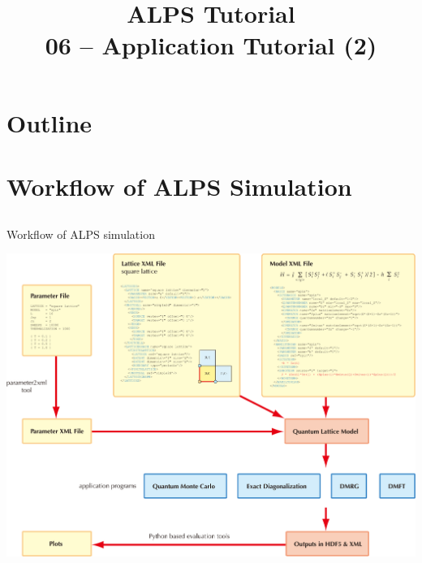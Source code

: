 
\title{ALPS Tutorial \\ 06 -- Application Tutorial (2)}




\begin{frame}
  \titlepage
\end{frame}

\section*{Outline}
\begin{frame}[t,fragile]
   \tableofcontents
\end{frame}

\section{Workflow of ALPS Simulation}
\subsection*{\redm\whiteb\greenb}

\begin{frame}{Workflow of ALPS simulation}
  \begin{center}
    \includegraphics[height=0.8\textheight]{workflow.pdf}
  \end{center}
\end{frame}

